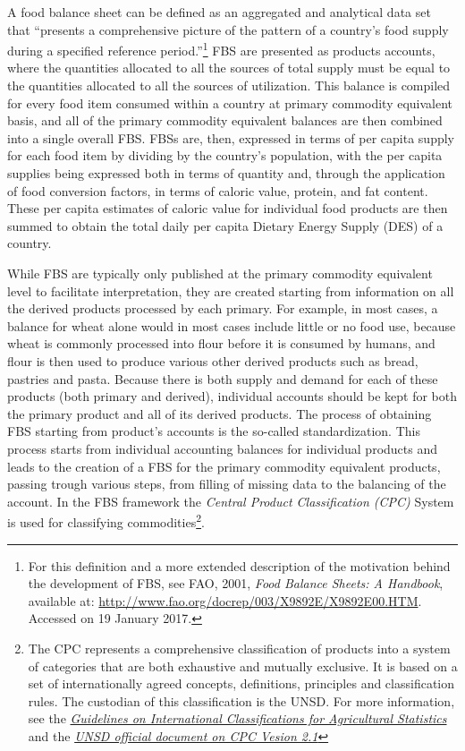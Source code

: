 \documentclass[]{article}
\let\rmarkdownfootnote\footnote%
\def\footnote{\protect\rmarkdownfootnote}
\begin{document}
A food balance sheet can be defined as an aggregated and analytical data
set that ``presents a comprehensive picture of the pattern of a
country's food supply during a specified reference period.''\footnote{For
  this definition and a more extended description of the motivation
  behind the development of FBS, see FAO, 2001, \emph{Food Balance
  Sheets: A Handbook}, available at:
  \url{http://www.fao.org/docrep/003/X9892E/X9892E00.HTM}. Accessed on
  19 January 2017.} FBS are presented as products accounts, where the
quantities allocated to all the sources of total supply must be equal to
the quantities allocated to all the sources of utilization. This balance
is compiled for every food item consumed within a country at primary
commodity equivalent basis, and all of the primary commodity equivalent
balances are then combined into a single overall FBS. FBSs are, then,
expressed in terms of per capita supply for each food item by dividing
by the country's population, with the per capita supplies being
expressed both in terms of quantity and, through the application of food
conversion factors, in terms of caloric value, protein, and fat content.
These per capita estimates of caloric value for individual food products
are then summed to obtain the total daily per capita Dietary Energy
Supply (DES) of a country.

While FBS are typically only published at the primary commodity
equivalent level to facilitate interpretation, they are created starting
from information on all the derived products processed by each primary.
For example, in most cases, a balance for wheat alone would in most
cases include little or no food use, because wheat is commonly processed
into flour before it is consumed by humans, and flour is then used to
produce various other derived products such as bread, pastries and
pasta. Because there is both supply and demand for each of these
products (both primary and derived), individual accounts should be kept
for both the primary product and all of its derived products. The
process of obtaining FBS starting from product's accounts is the
so-called standardization. This process starts from individual
accounting balances for individual products and leads to the creation of
a FBS for the primary commodity equivalent products, passing trough
various steps, from filling of missing data to the balancing of the
account. In the FBS framework the \emph{Central Product Classification
(CPC)} System is used for classifying commodities\footnote{The CPC
  represents a comprehensive classification of products into a system of
  categories that are both exhaustive and mutually exclusive. It is
  based on a set of internationally agreed concepts, definitions,
  principles and classification rules. The custodian of this
  classification is the UNSD. For more information, see the
  \href{http://gsars.org/wp-content/uploads/2015/12/Guidelines-for-Int-Classifications-on-Agricultural-Statistics-web.pdf}{\emph{Guidelines
  on International Classifications for Agricultural Statistics}} and the
  \href{https://unstats.un.org/unsd/cr/downloads/CPCv2.1_complete\%28PDF\%29_English.pdf}{\emph{UNSD
  official document on CPC Vesion 2.1}}}.
\end{document}
